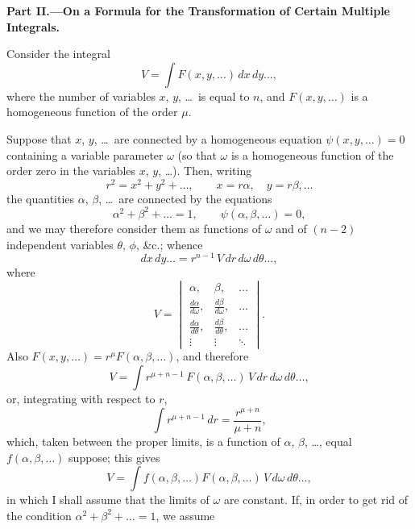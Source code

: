 \documentclass[11pt,a4paper]{book}
\begin{document}
\newpage
\begin{center}
\textbf{Part II.---On a Formula for the Transformation of Certain Multiple Integrals.}
\end{center}

\setcounter{page}{438}

Consider the integral
\[
V = \int F(x, y, \ldots)\, dx\, dy\ldots,
\]
where the number of variables $x$, $y$, \ldots\ is equal to $n$, and $F(x, y, \ldots)$ is a homogeneous function of the order $\mu$.

Suppose that $x$, $y$, \ldots\ are connected by a homogeneous equation $\psi(x, y, \ldots) = 0$ containing a variable parameter $\omega$ (so that $\omega$ is a homogeneous function of the order zero in the variables $x$, $y$, \ldots). Then, writing
\[
r^{2} = x^{2} + y^{2} + \ldots, \qquad x = r\alpha, \quad y = r\beta, \ldots
\]
the quantities $\alpha$, $\beta$, \ldots\ are connected by the equations
\[
\alpha^{2} + \beta^{2} + \ldots = 1, \qquad \psi(\alpha, \beta, \ldots) = 0,
\]
and we may therefore consider them as functions of $\omega$ and of $(n-2)$ independent variables $\theta$, $\phi$, \&c.; whence
\[
dx\, dy\ldots = r^{n-1}\, V\, dr\, d\omega\, d\theta\ldots,
\]
where
\[
V = \begin{vmatrix}
\alpha, & \beta, & \ldots \\
\frac{d\alpha}{d\omega}, & \frac{d\beta}{d\omega}, & \ldots \\
\frac{d\alpha}{d\theta}, & \frac{d\beta}{d\theta}, & \ldots \\
\vdots & \vdots & \ddots
\end{vmatrix}.
\]
Also $F(x, y, \ldots) = r^{\mu}F(\alpha, \beta, \ldots)$, and therefore
\[
V = \int r^{\mu+n-1}\, F(\alpha, \beta, \ldots)\, V\, dr\, d\omega\, d\theta\ldots,
\]
or, integrating with respect to $r$,
\[
\int r^{\mu+n-1}\, dr = \frac{r^{\mu+n}}{\mu+n},
\]
which, taken between the proper limits, is a function of $\alpha$, $\beta$, \ldots, equal $f(\alpha, \beta, \ldots)$ suppose; this gives
\[
V = \int f(\alpha, \beta, \ldots)F(\alpha, \beta, \ldots)\, V\, d\omega\, d\theta\ldots,
\]
in which I shall assume that the limits of $\omega$ are constant. If, in order to get rid of the condition $\alpha^{2} + \beta^{2} + \ldots = 1$, we assume

\newpage

\setcounter{page}{439}
\end{document}
